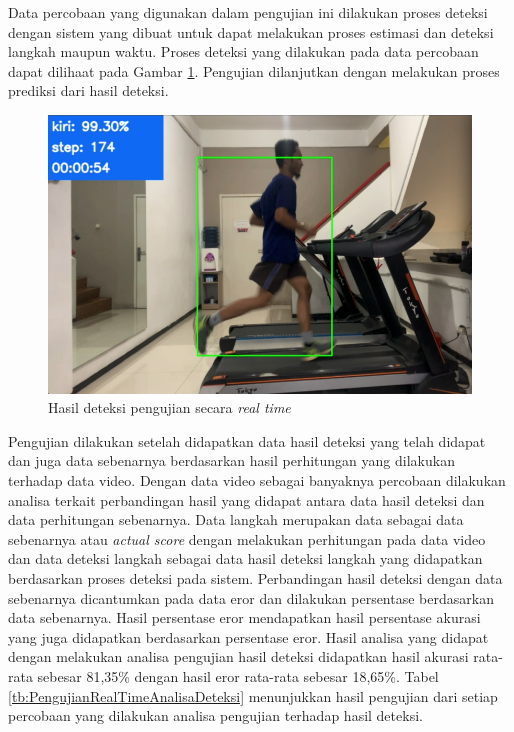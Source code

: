 Data percobaan yang digunakan dalam pengujian ini dilakukan proses deteksi dengan sistem yang dibuat untuk dapat melakukan proses estimasi dan deteksi langkah maupun waktu. Proses deteksi yang dilakukan pada data percobaan dapat dilihaat pada Gambar \ref{fig:PengujianRealTime2}. Pengujian dilanjutkan dengan melakukan proses prediksi dari hasil deteksi.

\begin{figure}[H]
  \centering
  \includegraphics[scale=0.5]{gambar/realtimedeteksi.png}
  \caption{Hasil deteksi pengujian secara \emph{real time}}
  \label{fig:PengujianRealTime2}
\end{figure}

Pengujian dilakukan setelah didapatkan data hasil deteksi yang telah didapat dan juga data sebenarnya berdasarkan hasil perhitungan yang dilakukan terhadap data video. Dengan data video sebagai banyaknya percobaan dilakukan analisa terkait perbandingan hasil yang didapat antara data hasil deteksi dan data perhitungan sebenarnya. Data langkah merupakan data sebagai data sebenarnya atau \emph{actual score} dengan melakukan perhitungan pada data video dan data deteksi langkah sebagai data hasil deteksi langkah yang didapatkan berdasarkan proses deteksi pada sistem. Perbandingan hasil deteksi dengan data sebenarnya dicantumkan pada data eror dan dilakukan persentase berdasarkan data sebenarnya. Hasil persentase eror mendapatkan hasil persentase akurasi yang juga didapatkan berdasarkan persentase eror. Hasil analisa yang didapat dengan melakukan analisa pengujian hasil deteksi didapatkan hasil akurasi rata-rata sebesar 81,35\% dengan hasil eror rata-rata sebesar 18,65\%. Tabel \ref{tb:PengujianRealTimeAnalisaDeteksi} menunjukkan hasil pengujian dari setiap percobaan yang dilakukan analisa pengujian terhadap hasil deteksi.

